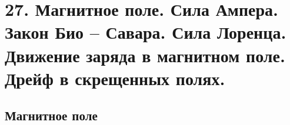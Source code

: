 \section*{27. Магнитное поле. Сила Ампера. Закон Био – Савара. Сила Лоренца.
Движение заряда в магнитном поле. Дрейф в скрещенных полях.}
 
\subsection*{Магнитное поле}

